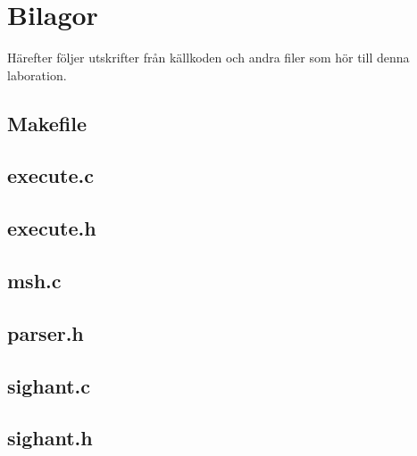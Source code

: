 \documentclass[a4paper, 12pt]{article}
\begin{document}
\newpage
\appendix
{}
\section{Bilagor}\label{Bilagor}
Härefter följer utskrifter från källkoden och andra filer som hör till
denna laboration.

\newpage
\subsection{Makefile}\label{Makefile}
\begin{scriptsize}
  
\end{scriptsize}

\subsection{execute.c}\label{execute.c}
\begin{scriptsize}
  
\end{scriptsize}

\subsection{execute.h}\label{execute.h}
\begin{scriptsize}
  
\end{scriptsize}

\subsection{msh.c}\label{msh.c}
\begin{scriptsize}
  
\end{scriptsize}

\subsection{parser.h}\label{parser.h}
\begin{scriptsize}
  
\end{scriptsize}

\subsection{sighant.c}\label{sighant.c}
\begin{scriptsize}
  
\end{scriptsize}

\subsection{sighant.h}\label{sighant.h}
\begin{scriptsize}
  
\end{scriptsize}
\end{document}
